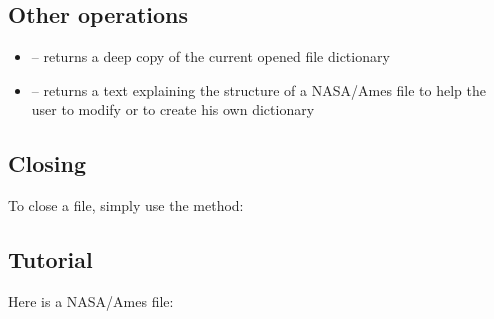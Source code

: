 \documentclass[a4paper,10pt,openany,english]{sphinxmanual}
\begin{document}
\subsection{Other operations}
\label{tutorial:id17}\begin{itemize}
\item {} 
 -- returns a deep copy of the current opened file dictionary

\item {} 
 -- returns a text explaining the structure of a NASA/Ames file to help the user to modify or to create his own dictionary

\end{itemize}


\subsection{Closing}
\label{tutorial:id18}
To close a file, simply use the  method:

\begin{sphinxVerbatim}[commandchars=\\\{\}]
\end{sphinxVerbatim}


\subsection{Tutorial}
\label{tutorial:id19}
Here is a NASA/Ames file:
\end{document}
